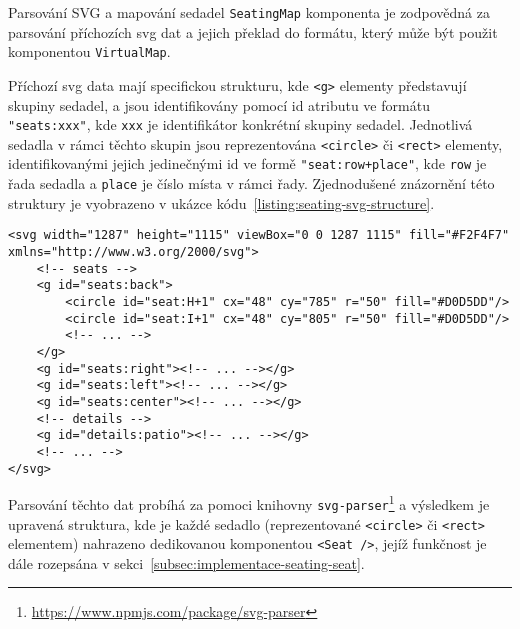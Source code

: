 \begin{subsection}{Parsování SVG a mapování sedadel}
    \label{subsec:implementace-seating-svg}
    \texttt{SeatingMap} komponenta je zodpovědná za parsování příchozích \ac{svg} dat a jejich překlad do formátu, který může být použit komponentou \texttt{VirtualMap}.

    Příchozí \ac{svg} data mají specifickou strukturu, kde \texttt{<g>} elementy představují skupiny sedadel, a jsou identifikovány pomocí id atributu ve formátu \texttt{"seats:xxx"}, kde \texttt{xxx} je identifikátor konkrétní skupiny sedadel.
    Jednotlivá sedadla v rámci těchto skupin jsou reprezentována \texttt{<circle>} či \texttt{<rect>} elementy, identifikovanými jejich jedinečnými id ve formě \texttt{"seat:row+place"}, kde \texttt{row} je řada sedadla a \texttt{place} je číslo místa v rámci řady.
    Zjednodušené znázornění této struktury je vyobrazeno v ukázce kódu~\ref{listing:seating-svg-structure}.

    \begin{listing}[H]
        \caption{Ukázka struktury \ac{svg} dat}
        \begin{verbatim}
<svg width="1287" height="1115" viewBox="0 0 1287 1115" fill="#F2F4F7" xmlns="http://www.w3.org/2000/svg">
    <!-- seats -->
    <g id="seats:back">
        <circle id="seat:H+1" cx="48" cy="785" r="50" fill="#D0D5DD"/>
        <circle id="seat:I+1" cx="48" cy="805" r="50" fill="#D0D5DD"/>
        <!-- ... -->
    </g>
    <g id="seats:right"><!-- ... --></g>
    <g id="seats:left"><!-- ... --></g>
    <g id="seats:center"><!-- ... --></g>
    <!-- details -->
    <g id="details:patio"><!-- ... --></g>
    <!-- ... -->
</svg>
        \end{verbatim}
        \label{listing:seating-svg-structure}
    \end{listing}

    Parsování těchto dat probíhá za pomoci knihovny \texttt{svg-parser}\footnote{\url{https://www.npmjs.com/package/svg-parser}} a výsledkem je upravená struktura, kde je každé sedadlo (reprezentované \texttt{<circle>} či \texttt{<rect>} elementem) nahrazeno dedikovanou komponentou \texttt{<Seat />}, jejíž funkčnost je dále rozepsána v sekci~\ref{subsec:implementace-seating-seat}.
\end{subsection}

